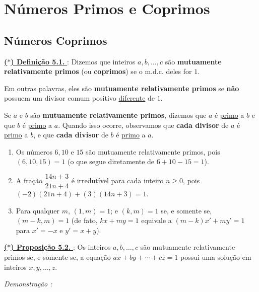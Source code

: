 \section*{Números Primos e Coprimos}

\subsection*{Números Coprimos}

\noindent\underline{\underline{\textbf{($\ast$) Definição 5.1. }}} : Dizemos que inteiros $a, b, \ldots, c$ são \textbf{mutuamente relativamente primos} (ou \textbf{coprimos}) 
se o m.d.c. deles for $1$.  

Em outras palavras, eles são \textbf{mutuamente relativamente primos} se \textbf{não} possuem um divisor comum
positivo \underline{diferente} de $1$.  

Se $a$ e $b$ são \textbf{mutuamente relativamente primos}, dizemos que $a$ é \underline{primo} a $b$ e que $b$ é \underline{primo} a $a$. 
Quando isso ocorre, observamos que \textbf{cada divisor} de $a$ é \underline{primo} a $b$, e que \textbf{cada divisor} de $b$ é \underline{primo} a $a$.

\begin{exemplo}
\begin{enumerate}
    \item Os números $6, 10$ e $15$ são mutuamente relativamente primos, pois $(6, 10, 15) = 1$ 
    (o que segue diretamente de $6 + 10 - 15 = 1$).
    
    \item A fração $\dfrac{14n+3}{21n+4}$ é irredutível para cada inteiro $n \ge 0$, 
    pois $(-2)(21n + 4) + (3)(14n + 3) = 1$.
    
    \item Para qualquer $m$, $(1, m) = 1$; e $(k, m) = 1$ se, e somente se, $(m - k, m) = 1$ 
    (de fato, $kx + my = 1$ equivale a $(m-k)x' + my' = 1$ para $x' = -x$ e $y' = x + y$).
\end{enumerate}
\end{exemplo}

\vspace{0.2cm}
\noindent\underline{\underline{\textbf{($\ast$) Proposição 5.2. }}} : Os inteiros $a, b, \ldots, c$ 
são mutuamente relativamente primos se, e somente se, a equação $ax + by + \cdots + cz = 1$ possui 
uma solução em inteiros $x, y, \ldots, z$.

\vspace{0.2cm}
\noindent\textit{Demonstração : }

